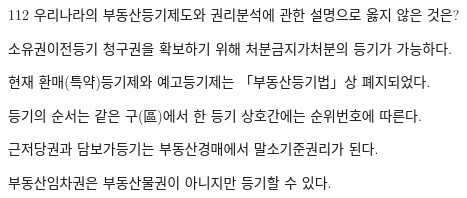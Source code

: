 \begin{question}{112}
우리나라의 부동산등기제도와 권리분석에 관한 설명으로 옳지 않은 것은?
\begin{choices}
  \item 소유권이전등기 청구권을 확보하기 위해 처분금지가처분의 등기가 가능하다.
  \item 현재 환매(특약)등기제와 예고등기제는 「부동산등기법」상 폐지되었다.
  \item 등기의 순서는 같은 구(區)에서 한 등기 상호간에는 순위번호에 따른다.
  \item 근저당권과 담보가등기는 부동산경매에서 말소기준권리가 된다.
  \item 부동산임차권은 부동산물권이 아니지만 등기할 수 있다.
\end{choices}
\end{question}
